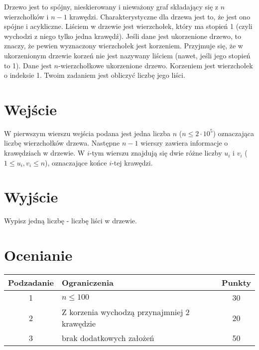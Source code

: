 \documentclass{spiral}
\begin{document}
    \makeheader

    \noindent Drzewo jest to spójny, nieskierowany i nieważony graf
    składający się z $n$ wierzchołków i $n-1$ krawędzi.
    Charakterystyczne dla drzewa jest to, że jest ono spójne i acykliczne.
    Liściem w drzewie jest wierzchołek, który ma stopień 1
    (czyli wychodzi z niego tylko jedna krawędź).
    Jeśli dane jest ukorzenione drzewo, to znaczy,
    że pewien wyznaczony wierzchołek jest korzeniem.
    Przyjmuje się, że w ukorzenionym drzewie korzeń nie jest nazywany liściem
    (nawet, jeśli jego stopień to 1).
    Dane jest $n$-wierzchołkowe ukorzenione drzewo.
    Korzeniem jest wierzchołek o indeksie 1.  
    Twoim zadaniem jest obliczyć liczbę jego liści.

\section{Wejście}

    W pierwszym wierszu wejścia podana jest jedna liczba $n$ ($n \leq 2 \cdot 10^5$)
    oznaczająca liczbę wierzchołków drzewa.
    Następne $n-1$ wierszy zawiera informacje o krawędziach w drzewie.
    W $i$-tym wierszu znajdują się dwie różne liczby $u_i$ i $v_i$
    ($1 \leq u_i, v_i \leq n$), oznaczające końce $i$-tej krawędzi.

\section{Wyjście}

    Wypisz jedną liczbę - liczbę liści w drzewie.


\section{Ocenianie}

    \begin{center}
        \begin{tabular}{|c|p{5cm}|c|}
            \hline
            \textbf{Podzadanie} & \textbf{Ograniczenia} & \textbf{Punkty} \\
            \hline
            1 & $n \leq 100$ & 30 \\
            \hline
            2 & Z korzenia wychodzą przynajmniej 2 krawędzie & 20 \\
            \hline
            3 & brak dodatkowych założeń & 50 \\
            \hline
        \end{tabular}
    \end{center}
\end{document}

